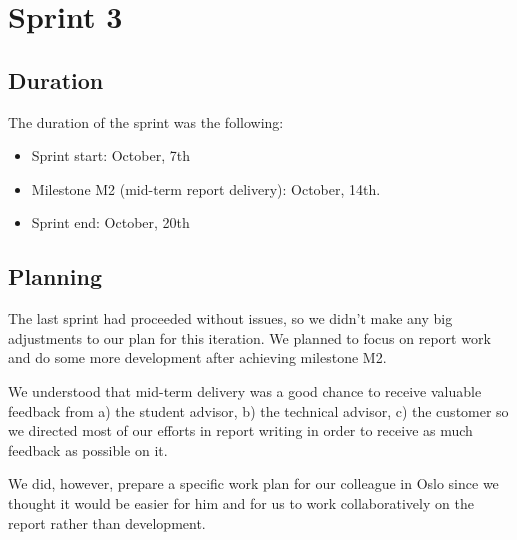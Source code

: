 
\chapter{Sprint 3}
\label{Sprint3}

\section{Duration}
The duration of the sprint was the following:
\begin{itemize}
\item Sprint start:  October, 7th
\item Milestone M2 (mid-term report delivery): October, 14th.
\item Sprint end: October, 20th
\end{itemize}

\section{Planning}

The last sprint had proceeded without issues, so we didn't make any big adjustments
to our plan for this iteration. We planned to focus on report work and do some more development
after achieving milestone M2.

We understood that mid-term delivery was a good chance
to receive valuable feedback from a) the student advisor, b) the technical advisor, c) the customer
so we directed most of our efforts in report writing in order to receive as much
feedback as possible on it.

We did, however, prepare a specific work plan for our colleague in Oslo since we thought it would be easier
for him and for us to work collaboratively on the report rather than development.

